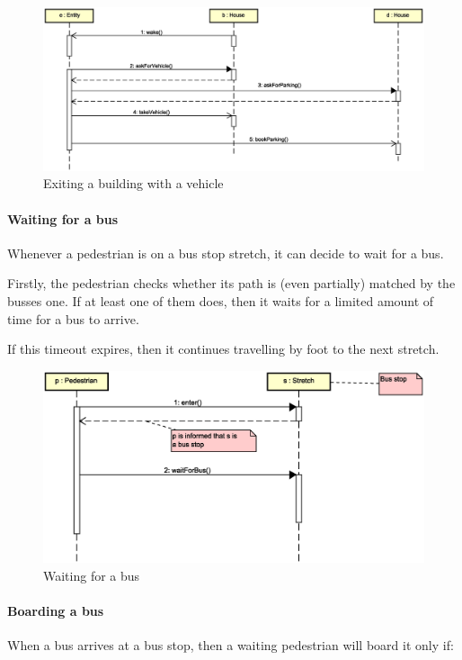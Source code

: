 \begin{figure}[H]
  \centering
  \includegraphics[width=\columnwidth,trim=1 0 0 0,clip]
    {sections/images/solution/going-out-vehicle.eps}
  \caption{Exiting a building with a vehicle}
  \label{fig:app-inter-vehicle}
\end{figure}

\paragraph{Waiting for a bus} 
Whenever a pedestrian is on a bus stop stretch, 
it can decide to wait for a bus.

Firstly, the pedestrian checks whether its path is (even partially) 
matched by the busses one.
If at least one of them does, then it waits 
for a limited amount of time for a bus to arrive.

If this timeout expires, 
then it continues travelling by foot to the next stretch.

\begin{figure}[H]
  \centering
  \includegraphics[width=\columnwidth,trim=1 0 2 0,clip]
    {sections/images/solution/bus-waiting.eps}
  \caption{Waiting for a bus}
  \label{fig:app-inter-wait-bus}
\end{figure}

\paragraph{Boarding a bus} When a bus arrives at a bus stop, then a waiting
pedestrian will board it only if:

